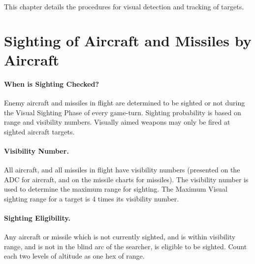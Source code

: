 
\label{rule:visual-sighting}

This chapter details the procedures for visual detection and tracking of targets. 

\section{Sighting of Aircraft and Missiles by Aircraft}
\label{rule:sighting-aircraft-and-missiles}


\paragraph{When is Sighting Checked?}  Enemy aircraft and missiles in flight are determined to be sighted or not during the Visual Sighting Phase of every game-turn. Sighting probability is based on range and visibility numbers. Visually aimed weapons may only be fired at sighted aircraft targets.


\paragraph{Visibility Number.} All aircraft, and all missiles in flight have visibility numbers (presented on the ADC for aircraft, and on the missile charts for missiles). The visibility number is used to determine the maximum range for sighting. The Maximum Visual sighting range for a target is 4 times its visibility number.

\paragraph{Sighting Eligibility.} Any aircraft or missile which is not currently sighted, and is within visibility range, and is not in the blind arc of the searcher, is eligible to be sighted. Count each two levels of altitude as one hex of range.

